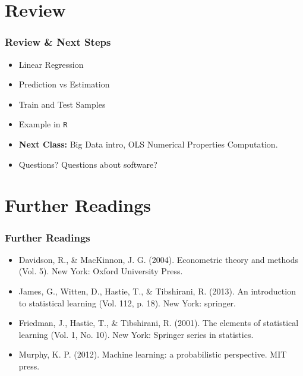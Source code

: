 \documentclass[
  shownotes,
  xcolor={svgnames},
  hyperref={colorlinks,citecolor=DarkBlue,linkcolor=DarkRed,urlcolor=DarkBlue}
  ]{beamer}
\begin{document}
\section{Review}
\begin{frame}
\frametitle{Review \& Next Steps}
  
  \begin{itemize} 
    \item Linear Regression
    \item Prediction vs Estimation
    \item Train and Test Samples
    \item Example in \texttt{R}
  \bigskip  

  
  \item  {\bf Next Class:} Big Data intro, OLS Numerical Properties Computation.
  \bigskip
  \item Questions? Questions about software? 
  
  \end{itemize}


\end{frame}


\section{Further Readings}
\begin{frame}
\frametitle{Further Readings}

\begin{itemize}
  \item Davidson, R., \& MacKinnon, J. G. (2004). Econometric theory and methods (Vol. 5). New York: Oxford University Press.
  \bigskip
  \item James, G., Witten, D., Hastie, T., \& Tibshirani, R. (2013). An introduction to statistical learning (Vol. 112, p. 18). New York: springer.
  \bigskip
  \item Friedman, J., Hastie, T., \& Tibshirani, R. (2001). The elements of statistical learning (Vol. 1, No. 10). New York: Springer series in statistics.
  \bigskip
  \item Murphy, K. P. (2012). Machine learning: a probabilistic perspective. MIT press.

\end{itemize}

\end{frame}
\end{document}

